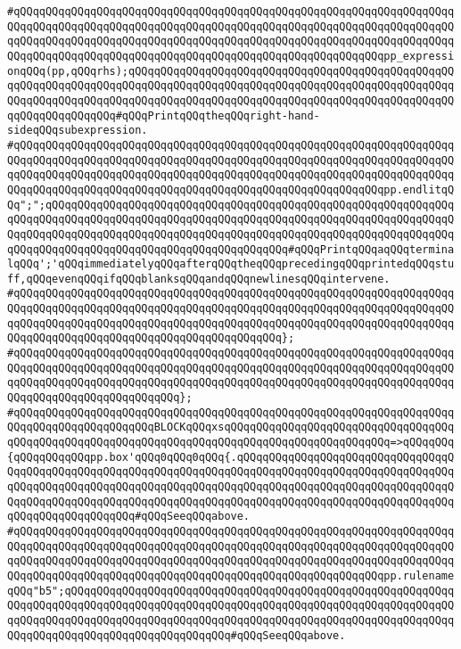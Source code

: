 \verb|#qQQqqQQqqQQqqQQqqQQqqQQqqQQqqQQqqQQqqQQqqQQqqQQqqQQqqQQqqQQqqQQqqQQqqQQqqQQqqQQqqQQqqQQqqQQqqQQqqQQqqQQqqQQqqQQqqQQqqQQqqQQqqQQqqQQqqQQqqQQqqQQqqQQqqQQqqQQqqQQqqQQqqQQqqQQqqQQqqQQqqQQqqQQqqQQqqQQqqQQqqQQqqQQqqQQqqQQqqQQqqQQqqQQqqQQqqQQqqQQqqQQqqQQqqQQqqQQqqQQqqQQqqQQqpp_expressionqQQq(pp,qQQqrhs);qQQqqQQqqQQqqQQqqQQqqQQqqQQqqQQqqQQqqQQqqQQqqQQqqQQqqQQqqQQqqQQqqQQqqQQqqQQqqQQqqQQqqQQqqQQqqQQqqQQqqQQqqQQqqQQqqQQqqQQqqQQqqQQqqQQqqQQqqQQqqQQqqQQqqQQqqQQqqQQqqQQqqQQqqQQqqQQqqQQqqQQqqQQqqQQqqQQqqQQqqQQqqQQq#qQQqPrintqQQqtheqQQqright-hand-sideqQQqsubexpression.|\newline
\verb|#qQQqqQQqqQQqqQQqqQQqqQQqqQQqqQQqqQQqqQQqqQQqqQQqqQQqqQQqqQQqqQQqqQQqqQQqqQQqqQQqqQQqqQQqqQQqqQQqqQQqqQQqqQQqqQQqqQQqqQQqqQQqqQQqqQQqqQQqqQQqqQQqqQQqqQQqqQQqqQQqqQQqqQQqqQQqqQQqqQQqqQQqqQQqqQQqqQQqqQQqqQQqqQQqqQQqqQQqqQQqqQQqqQQqqQQqqQQqqQQqqQQqqQQqqQQqqQQqqQQqqQQqqQQqpp.endlitqQQq";";qQQqqQQqqQQqqQQqqQQqqQQqqQQqqQQqqQQqqQQqqQQqqQQqqQQqqQQqqQQqqQQqqQQqqQQqqQQqqQQqqQQqqQQqqQQqqQQqqQQqqQQqqQQqqQQqqQQqqQQqqQQqqQQqqQQqqQQqqQQqqQQqqQQqqQQqqQQqqQQqqQQqqQQqqQQqqQQqqQQqqQQqqQQqqQQqqQQqqQQqqQQqqQQqqQQqqQQqqQQqqQQqqQQqqQQqqQQqqQQqqQQqqQQq#qQQqPrintqQQqaqQQqterminalqQQq';'qQQqimmediatelyqQQqafterqQQqtheqQQqprecedingqQQqprintedqQQqstuff,qQQqevenqQQqifqQQqblanksqQQqandqQQqnewlinesqQQqintervene.|\newline
\verb|#qQQqqQQqqQQqqQQqqQQqqQQqqQQqqQQqqQQqqQQqqQQqqQQqqQQqqQQqqQQqqQQqqQQqqQQqqQQqqQQqqQQqqQQqqQQqqQQqqQQqqQQqqQQqqQQqqQQqqQQqqQQqqQQqqQQqqQQqqQQqqQQqqQQqqQQqqQQqqQQqqQQqqQQqqQQqqQQqqQQqqQQqqQQqqQQqqQQqqQQqqQQqqQQqqQQqqQQqqQQqqQQqqQQqqQQqqQQqqQQqqQQqqQQqqQQq};|\newline
\verb|#qQQqqQQqqQQqqQQqqQQqqQQqqQQqqQQqqQQqqQQqqQQqqQQqqQQqqQQqqQQqqQQqqQQqqQQqqQQqqQQqqQQqqQQqqQQqqQQqqQQqqQQqqQQqqQQqqQQqqQQqqQQqqQQqqQQqqQQqqQQqqQQqqQQqqQQqqQQqqQQqqQQqqQQqqQQqqQQqqQQqqQQqqQQqqQQqqQQqqQQqqQQqqQQqqQQqqQQqqQQqqQQqqQQqqQQqqQQq};|\newline
\verb|#qQQqqQQqqQQqqQQqqQQqqQQqqQQqqQQqqQQqqQQqqQQqqQQqqQQqqQQqqQQqqQQqqQQqqQQqqQQqqQQqqQQqqQQqqQQqBLOCKqQQqxsqQQqqQQqqQQqqQQqqQQqqQQqqQQqqQQqqQQqqQQqqQQqqQQqqQQqqQQqqQQqqQQqqQQqqQQqqQQqqQQqqQQqqQQqqQQqqQQq=>qQQqqQQq{qQQqqQQqqQQqpp.box'qQQq0qQQq0qQQq{.qQQqqQQqqQQqqQQqqQQqqQQqqQQqqQQqqQQqqQQqqQQqqQQqqQQqqQQqqQQqqQQqqQQqqQQqqQQqqQQqqQQqqQQqqQQqqQQqqQQqqQQqqQQqqQQqqQQqqQQqqQQqqQQqqQQqqQQqqQQqqQQqqQQqqQQqqQQqqQQqqQQqqQQqqQQqqQQqqQQqqQQqqQQqqQQqqQQqqQQqqQQqqQQqqQQqqQQqqQQqqQQqqQQqqQQqqQQqqQQqqQQqqQQqqQQqqQQqqQQqqQQq#qQQqSeeqQQqabove.|\newline
\verb|#qQQqqQQqqQQqqQQqqQQqqQQqqQQqqQQqqQQqqQQqqQQqqQQqqQQqqQQqqQQqqQQqqQQqqQQqqQQqqQQqqQQqqQQqqQQqqQQqqQQqqQQqqQQqqQQqqQQqqQQqqQQqqQQqqQQqqQQqqQQqqQQqqQQqqQQqqQQqqQQqqQQqqQQqqQQqqQQqqQQqqQQqqQQqqQQqqQQqqQQqqQQqqQQqqQQqqQQqqQQqqQQqqQQqqQQqqQQqqQQqqQQqqQQqqQQqqQQqqQQqqQQqqQQqpp.rulenameqQQq"b5";qQQqqQQqqQQqqQQqqQQqqQQqqQQqqQQqqQQqqQQqqQQqqQQqqQQqqQQqqQQqqQQqqQQqqQQqqQQqqQQqqQQqqQQqqQQqqQQqqQQqqQQqqQQqqQQqqQQqqQQqqQQqqQQqqQQqqQQqqQQqqQQqqQQqqQQqqQQqqQQqqQQqqQQqqQQqqQQqqQQqqQQqqQQqqQQqqQQqqQQqqQQqqQQqqQQqqQQqqQQqqQQqqQQqqQQqqQQq#qQQqSeeqQQqabove.|\newline
